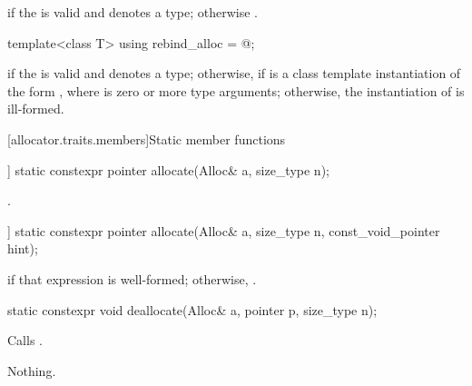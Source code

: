 \begin{itemdescr}
\pnum
\ctype {} if
the  
is valid and denotes a type;
otherwise .
\end{itemdescr}

%
\begin{itemdecl}
template<class T> using rebind_alloc = @\seebelow@;
\end{itemdecl}

\begin{itemdescr}
\pnum
\templalias {} if
the   is valid and denotes a
type; otherwise,
 if  is a class template instantiation
of the form , where  is zero or more type arguments;
otherwise, the instantiation of  is ill-formed.
\end{itemdescr}

[allocator.traits.members]{Static member functions}

%
\begin{itemdecl}
[[nodiscard]] static constexpr pointer allocate(Alloc& a, size_type n);
\end{itemdecl}

\begin{itemdescr}
\pnum
\returns
{}.
\end{itemdescr}

%
\begin{itemdecl}
[[nodiscard]] static constexpr pointer allocate(Alloc& a, size_type n, const_void_pointer hint);
\end{itemdecl}

\begin{itemdescr}
\pnum
\returns
{} if that expression is well-formed; otherwise, .
\end{itemdescr}

%
\begin{itemdecl}
static constexpr void deallocate(Alloc& a, pointer p, size_type n);
\end{itemdecl}

\begin{itemdescr}
\pnum
\effects
Calls .

\pnum
\throws
Nothing.
\end{itemdescr}

